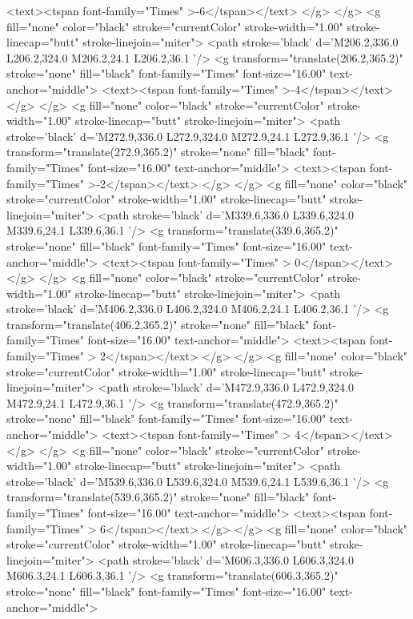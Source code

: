		<text><tspan font-family="Times" >-6</tspan></text>
	</g>
</g>
<g fill="none" color="black" stroke="currentColor" stroke-width="1.00" stroke-linecap="butt" stroke-linejoin="miter">
	<path stroke='black'  d='M206.2,336.0 L206.2,324.0 M206.2,24.1 L206.2,36.1  '/>	<g transform="translate(206.2,365.2)" stroke="none" fill="black" font-family="Times" font-size="16.00"  text-anchor="middle">
		<text><tspan font-family="Times" >-4</tspan></text>
	</g>
</g>
<g fill="none" color="black" stroke="currentColor" stroke-width="1.00" stroke-linecap="butt" stroke-linejoin="miter">
	<path stroke='black'  d='M272.9,336.0 L272.9,324.0 M272.9,24.1 L272.9,36.1  '/>	<g transform="translate(272.9,365.2)" stroke="none" fill="black" font-family="Times" font-size="16.00"  text-anchor="middle">
		<text><tspan font-family="Times" >-2</tspan></text>
	</g>
</g>
<g fill="none" color="black" stroke="currentColor" stroke-width="1.00" stroke-linecap="butt" stroke-linejoin="miter">
	<path stroke='black'  d='M339.6,336.0 L339.6,324.0 M339.6,24.1 L339.6,36.1  '/>	<g transform="translate(339.6,365.2)" stroke="none" fill="black" font-family="Times" font-size="16.00"  text-anchor="middle">
		<text><tspan font-family="Times" > 0</tspan></text>
	</g>
</g>
<g fill="none" color="black" stroke="currentColor" stroke-width="1.00" stroke-linecap="butt" stroke-linejoin="miter">
	<path stroke='black'  d='M406.2,336.0 L406.2,324.0 M406.2,24.1 L406.2,36.1  '/>	<g transform="translate(406.2,365.2)" stroke="none" fill="black" font-family="Times" font-size="16.00"  text-anchor="middle">
		<text><tspan font-family="Times" > 2</tspan></text>
	</g>
</g>
<g fill="none" color="black" stroke="currentColor" stroke-width="1.00" stroke-linecap="butt" stroke-linejoin="miter">
	<path stroke='black'  d='M472.9,336.0 L472.9,324.0 M472.9,24.1 L472.9,36.1  '/>	<g transform="translate(472.9,365.2)" stroke="none" fill="black" font-family="Times" font-size="16.00"  text-anchor="middle">
		<text><tspan font-family="Times" > 4</tspan></text>
	</g>
</g>
<g fill="none" color="black" stroke="currentColor" stroke-width="1.00" stroke-linecap="butt" stroke-linejoin="miter">
	<path stroke='black'  d='M539.6,336.0 L539.6,324.0 M539.6,24.1 L539.6,36.1  '/>	<g transform="translate(539.6,365.2)" stroke="none" fill="black" font-family="Times" font-size="16.00"  text-anchor="middle">
		<text><tspan font-family="Times" > 6</tspan></text>
	</g>
</g>
<g fill="none" color="black" stroke="currentColor" stroke-width="1.00" stroke-linecap="butt" stroke-linejoin="miter">
	<path stroke='black'  d='M606.3,336.0 L606.3,324.0 M606.3,24.1 L606.3,36.1  '/>	<g transform="translate(606.3,365.2)" stroke="none" fill="black" font-family="Times" font-size="16.00"  text-anchor="middle">
